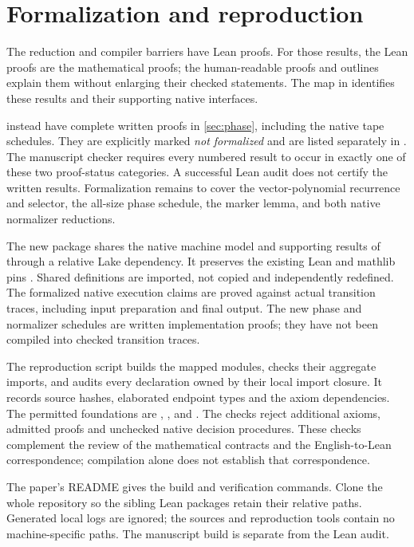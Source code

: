 \section{Formalization and reproduction}
\label{sec:verification}
The reduction and compiler barriers have Lean proofs. For those results,
the Lean proofs are the mathematical proofs; the human-readable proofs and
outlines explain them without enlarging their checked statements. The map
in  identifies these results and their
supporting native interfaces.

 instead have
complete written proofs in \cref{sec:phase}, including the native tape
schedules. They are explicitly marked \emph{not formalized} and are listed
separately in . The manuscript
checker requires every numbered result to occur in exactly one of these
two proof-status categories. A successful Lean audit does not certify the
written results. Formalization remains to cover the vector-polynomial
recurrence and selector, the all-size phase schedule, the marker lemma,
and both native normalizer reductions.

The new package shares the native machine model and supporting results of
\cite{FirstPaper2026,SecondPaper2026} through a relative Lake dependency.
It preserves the existing Lean and mathlib pins
\cite{Lean4,Mathlib2020,Mathlib4}. Shared definitions are imported, not copied
and independently redefined. The formalized native execution claims are proved
against actual transition traces, including input preparation and final
output. The new phase and normalizer schedules are written implementation
proofs; they have not been compiled into checked transition traces.

The reproduction script builds the mapped modules, checks their aggregate
imports, and audits every declaration owned by their local import closure.
It records source hashes, elaborated endpoint types and the axiom dependencies.
The permitted foundations are , , and
. The checks reject additional axioms, admitted proofs and
unchecked native decision procedures. These checks complement the review of
the mathematical contracts and the English-to-Lean correspondence; compilation
alone does not establish that correspondence.

The paper's README gives the build and verification commands. Clone the whole
repository so the sibling Lean packages retain their relative paths. Generated
local logs are ignored; the sources and reproduction tools contain no
machine-specific paths. The manuscript build is separate from the Lean audit.
